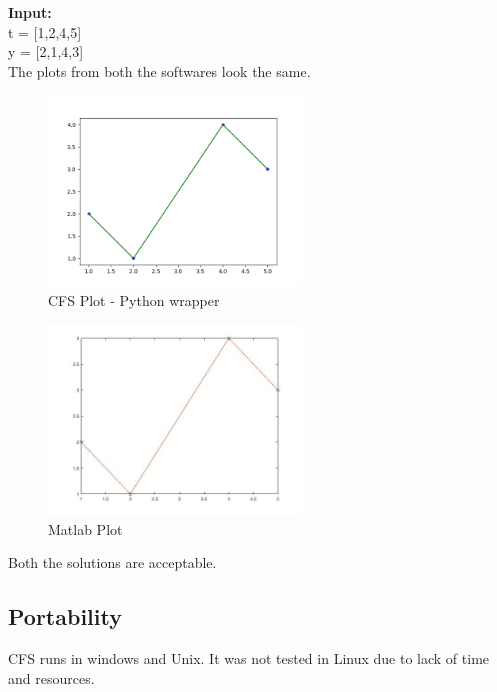 \documentclass[12pt, titlepage]{article}
\newcommand{\famname}{CFS}
\begin{document}
\noindent \textbf{Input:}\\
t = [1,2,4,5]\\
y = [2,1,4,3]\\

The plots from both the softwares look the same. 

\begin{figure}[h!]
	\begin{center}
		\includegraphics[width=0.6\textwidth]{PythonPlot.png}
		\caption{CFS Plot - Python wrapper}
		\label{Fig_Python} 
	\end{center}
\end{figure}

\begin{figure}[h!]
	\begin{center}
		\includegraphics[width=0.6\textwidth]{Matlab.jpg}
		\caption{Matlab Plot}
		\label{Fig_Matlab} 
	\end{center}
\end{figure}

Both the solutions are acceptable.

\subsection{Portability}

\famname{} runs in windows and Unix. It was not tested in Linux due to 
lack of 
time and resources.
\end{document}
